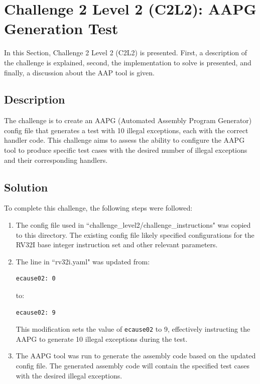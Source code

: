 \section{Challenge 2 Level 2 (C2L2): AAPG Generation Test}

In this Section, Challenge 2 Level 2 (C2L2) is presented. First, a description of the challenge is explained, second, the implementation to solve is presented, and finally, a discussion about the AAP tool is given. 

\subsection{Description}

The challenge is to create an AAPG (Automated Assembly Program Generator) config file that generates a test with 10 illegal exceptions, each with the correct handler code. This challenge aims to assess the ability to configure the AAPG tool to produce specific test cases with the desired number of illegal exceptions and their corresponding handlers.

\subsection{Solution}

To complete this challenge, the following steps were followed:

\begin{enumerate}
    \item The config file used in ``challenge\_level2/challenge\_instructions" was copied to this directory. The existing config file likely specified configurations for the RV32I base integer instruction set and other relevant parameters.
    \item The line in ``rv32i.yaml" was updated from:
    
\begin{verbatim}
ecause02: 0
\end{verbatim}

    to:
    
\begin{verbatim}
ecause02: 9
\end{verbatim}
    
    This modification sets the value of \texttt{ecause02} to 9, effectively instructing the AAPG to generate 10 illegal exceptions during the test.
    
    \item The AAPG tool was run to generate the assembly code based on the updated config file. The generated assembly code will contain the specified test cases with the desired illegal exceptions.
\end{enumerate}

